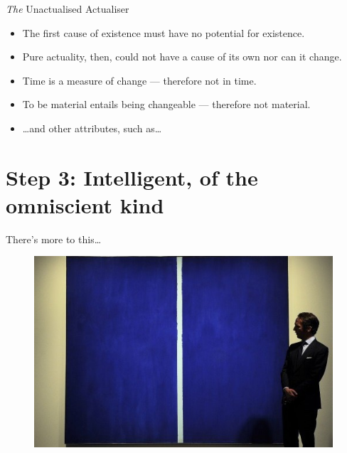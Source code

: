\documentclass[xcolor=dvipsnames]{beamer}
\begin{document}
\begin{frame}[fragile]{\emph{The} Unactualised Actualiser}
  \begin{itemize}
  \item The first cause of existence must have no potential for existence. \vspace{5mm}
  \item Pure actuality, then, could not have a cause of its own nor can it change. \vspace{5mm}
  \item Time is a measure of change --- therefore not in time. \vspace{5mm}
  \item To be material entails being changeable --- therefore not material. \vspace{5mm}
  \item \ldots and other attributes, such as\ldots
  \end{itemize}
\end{frame}


\section{Step 3: Intelligent, of the omniscient kind}


\begin{frame}{There's more to this{\ldots}}
\begin{figure}
  \centering
  \begin{columns}
    \centering
    \includegraphics[width=0.99\textwidth]{abstract}
  \end{columns}
\end{figure}
\end{frame}
\end{document}

